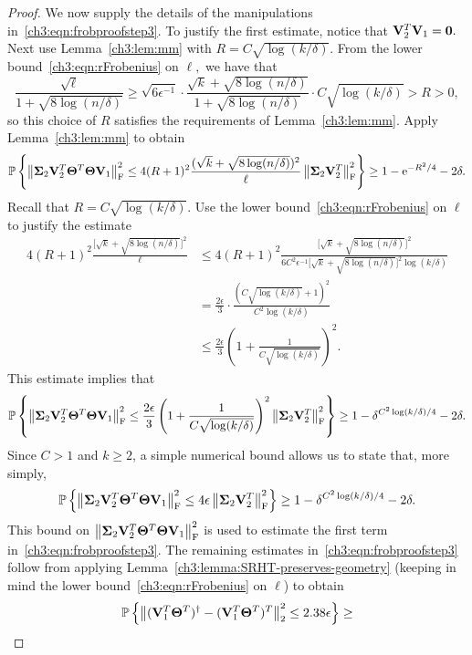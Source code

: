 \begin{proof}
 We now supply the details of the manipulations in~\eqref{ch3:eqn:frobproofstep3}.
To justify the first estimate, notice that 
$\mathbf{V}_2^T \mathbf{V}_1 = \bm{0}.$ Next use Lemma~\ref{ch3:lem:mm} 
with $R = C \sqrt{\log(k/\delta)}.$ 
From the lower bound~\eqref{ch3:eqn:rFrobenius} on $\ell,$ we have that
\[
\frac{\sqrt{\ell}}{1 + \sqrt{8\log(n/\delta)}} \geq 
\sqrt{6\epsilon^{-1}} \cdot \frac{\sqrt{k} + \sqrt{8 \log(n/\delta)}}%
 {1 + \sqrt{8 \log(n/\delta)}} \cdot 
 C \sqrt{\log(k/\delta)} > R > 0,
\]
so this choice of $R$ satisfies the requirements of 
Lemma~\ref{ch3:lem:mm}. Apply Lemma~\ref{ch3:lem:mm} to obtain
\[
\mathbb{P}\left\{ \left\|\mathbf{\Sigma}_2 \mathbf{V}_2 ^T \mathbf{\Theta}^T \mathbf{\Theta} \mathbf{V}_1\right\|_\mathrm{F}^2 
\le 4 (R + 1)^2 \frac{(\sqrt{k} + \sqrt{8 \log(n/\delta)})^2}{\ell} 
\left\|\mathbf{\Sigma}_2 \mathbf{V}_2^T\right\|_\mathrm{F}^2 \right\} \geq 1-\mathrm{e}^{-R^2/4}-2\delta.
\]
Recall that $R = C \sqrt{\log(k/\delta)}.$ Use the lower 
bound~\eqref{ch3:eqn:rFrobenius} on $\ell$ to justify the estimate
\begin{align*}
4 (R + 1)^2 \frac{\big[\sqrt{k} + \sqrt{8 \log(n/\delta)} \big]^2}{\ell} 
& \leq 4 (R + 1)^2 \frac{\big[\sqrt{k} + 
\sqrt{8 \log(n/\delta)}\big]^2}{6C^2 \epsilon^{-1} 
\big[\sqrt{k} + \sqrt{8 \log(n/\delta)}\big]^2 \log(k/\delta)} \\
 & = \frac{2 \epsilon}{3} \cdot 
 \frac{( C \sqrt{\log(k/\delta)} + 1)^2}{C^2 \log(k/\delta)} \\
 & \leq \frac{2 \epsilon}{3} 
 \left( 1 + \frac{1}{C \sqrt{\log(k/\delta)}} \right)^2.
\end{align*}
This estimate implies that
\[
 \mathbb{P}\left\{ \left\|\mathbf{\Sigma}_2 \mathbf{V}_2 ^T \mathbf{\Theta}^T \mathbf{\Theta} \mathbf{V}_1\right\|_\mathrm{F}^2 
 \le \frac{2 \epsilon}{3} 
  \left(1 + \frac{1}{C\sqrt{\log(k/\delta)}}\right)^2 
  \left\|\mathbf{\Sigma}_2 \mathbf{V}_2 ^T  \right\|_\mathrm{F}^2\right\} \geq 
  1 - \delta^{C^2 \log(k/\delta) /4} - 2\delta.
\]
Since $C > 1$ and $k \geq 2$, a simple numerical bound allows us 
to state that, more simply,
\[
 \mathbb{P}\left\{ \left\|\mathbf{\Sigma}_2 \mathbf{V}_2 ^T \mathbf{\Theta}^T \mathbf{\Theta} \mathbf{V}_1\right\|_\mathrm{F}^2 
 \le 4 \epsilon \left\|\mathbf{\Sigma}_2 \mathbf{V}_2 ^T \right\|_\mathrm{F}^2 \right\} \geq 
 1 - \delta^{C^2 \log(k/\delta)/4} - 2\delta.
\]
This bound on $\left\|\mathbf{\Sigma}_2 \mathbf{V}_2 ^T \mathbf{\Theta}^T \mathbf{\Theta} \mathbf{V}_1\right\|_\mathrm{F}^2$
is used to estimate the first term in~\eqref{ch3:eqn:frobproofstep3}.
The remaining estimates in~\eqref{ch3:eqn:frobproofstep3} follow from applying 
Lemma~\ref{ch3:lemma:SRHT-preserves-geometry} (keeping in mind the lower 
bound~\eqref{ch3:eqn:rFrobenius} on $\ell$) to obtain
\[
\mathbb{P}\left\{\left\|(\mathbf{V}_1^T \mathbf{\Theta}^T)^\dagger - 
        (\mathbf{V}_1^T \mathbf{\Theta}^T)^T\right\|_2^2 \le 2.38 \epsilon\right\} \geq 
\]
\end{proof}
